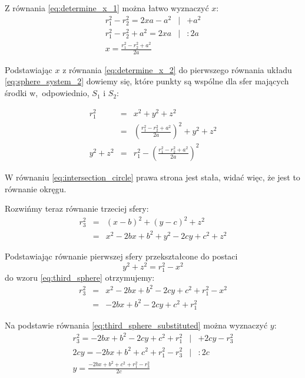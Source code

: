 Z równania \ref{eq:determine_x_1} można łatwo wyznaczyć $x$:
\begin{eqnarray}
 r_1^2 - r_2^2 = 2xa - a^2 & | & + a^2\\
 r_1^2 - r_2^2 + a^2 = 2xa & | & \colon 2a\\
 x = \frac{r_1^2 - r_2^2 + a^2}{2a} \label{eq:determine_x_2}
\end{eqnarray}

Podstawiając $x$ z równania \ref{eq:determine_x_2} do pierwszego równania układu \ref{eq:sphere_system_2} dowiemy się, które punkty są wspólne dla sfer mających środki w,~odpowiednio, $S_1$ i $S_2$:

\begin{eqnarray}
 r_1^2 & = & x^2 + y^2 + z^2 \\
       & = &\left(\frac{r_1^2 - r_2^2 + a^2}{2a}\right)^2 + y^2 + z^2 \nonumber \\
 y^2 + z^2 & = & r_1^2 - \left(\frac{r_1^2 - r_2^2 + a^2}{2a}\right)^2 \label{eq:intersection_circle}
\end{eqnarray}

W równaniu \ref{eq:intersection_circle} prawa strona jest stała, widać więc, że jest to równanie okręgu.

Rozwińmy teraz równanie trzeciej sfery:
\begin{eqnarray}
 r^2_3 & = & (x - b)^2 + (y - c)^2 + z^2 \label{eq:third_sphere} \\
       & = & x^2 - 2bx + b^2 + y^2 - 2cy + c^2 + z^2 \nonumber
\end{eqnarray}

Podstawiając równanie pierwszej sfery przekształcone do postaci
\begin{equation*}
 y^2 + z^2 = r_1^2 - x^2
\end{equation*}
do wzoru \ref{eq:third_sphere} otrzymujemy:
\begin{eqnarray}
r_3^2 & = & x^2 - 2bx + b^2 - 2cy + c^2 + r_1^2 - x^2 \label{eq:third_sphere_substituted} \\
      & = & -2bx + b^2 - 2cy + c^2 + r_1^2 \nonumber
\end{eqnarray}

Na podstawie równania \ref{eq:third_sphere_substituted} można wyznaczyć $y$:
\begin{eqnarray}
 r_3^2 = -2bx + b^2 - 2cy + c^2 + r_1^2 & | & +2cy - r_3^2 \\
 2cy   = -2bx + b^2 + c^2 + r_1^2 - r_3^2 & | & \colon 2c \\
 y     = \frac{-2bx + b^2 + c^2 + r_1^2 - r_3^2}{2c} & & \label{determine_y}
\end{eqnarray}

